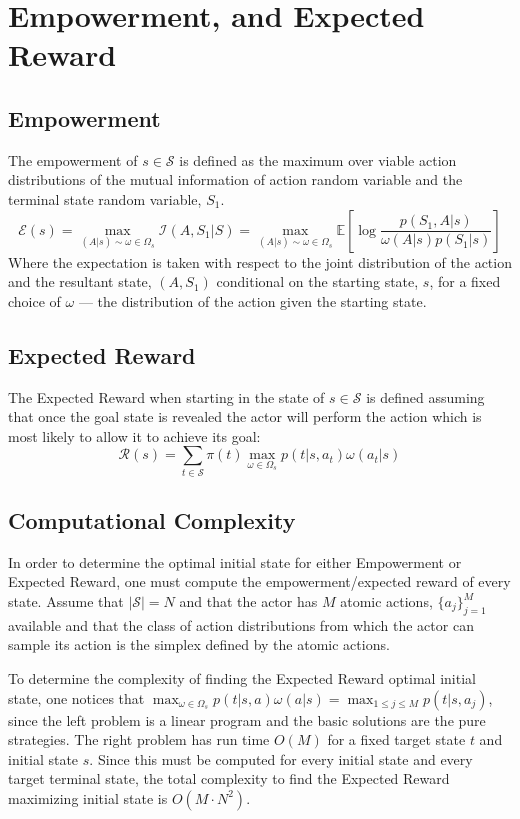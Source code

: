 \documentclass{article}
\newcommand{\EE}{\mathbb{E}}
\newcommand{\Ss}{\mathcal{S}}
\newcommand{\Ii}{\mathcal{I}}
\newcommand{\Ee}{\mathcal{E}}
\newcommand{\Rr}{\mathcal{R}}
\begin{document}
\section{Empowerment, and Expected Reward}
\subsection{Empowerment}
The empowerment of $s\in\mathcal{S}$ is defined as the maximum over viable action distributions of the mutual information of action random variable and the terminal state random variable, $S_1$.
\[\Ee(s)=\max_{(A|s)\sim\omega\in\Omega_s}\Ii(A,S_1|S)=\max_{(A|s)\sim\omega\in\Omega_s}\EE\left[\log\frac{p(S_1,A|s)}{\omega(A|s)p(S_1|s)}\right]\]
Where the expectation is taken with respect to the joint distribution of the action and the resultant state, $(A,S_1)$ conditional on the starting state, $s$, for a fixed choice of $\omega$ --- the distribution of the action given the starting state. 
\subsection{Expected Reward}
The Expected Reward when starting in the state of $s\in\mathcal{S}$ is defined assuming that once the goal state is revealed the actor will perform the action which is most likely to allow it to achieve its goal:
\[\Rr(s) = \sum_{t\in\Ss} \pi(t) \max_{\omega\in\Omega_s} p(t|s,a_t)\omega(a_t|s)\]
\subsection{Computational Complexity}
In order to determine the optimal initial state for either Empowerment or Expected Reward, one must compute the empowerment/expected reward of every state. Assume that $|\Ss|=N$ and that the actor has $M$ atomic actions, $\{a_j\}_{j=1}^M$ available and that the class of action distributions from which the actor can sample its action is the simplex defined by the atomic actions. 

To determine the complexity of finding the Expected Reward optimal initial state, one notices that $\max_{\omega\in\Omega_s} p(t|s,a)\omega(a|s) = \max_{1\leq j \leq M} p(t|s,a_j)$, since the left problem is a linear program and the basic solutions are the pure strategies. The right problem has run time $O(M)$ for a fixed target state $t$ and initial state $s$. Since this must be computed for every initial state and every target terminal state, the total complexity to find the Expected Reward maximizing initial state is $O(M\cdot N^2)$. 
\end{document}
